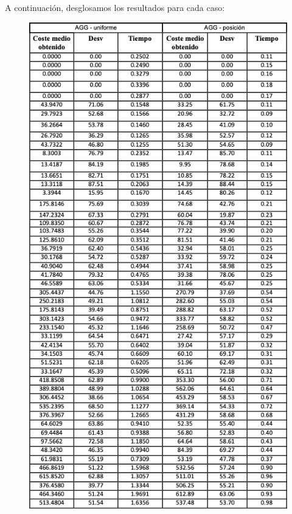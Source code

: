 A continuación, desglosamos los resultados para cada caso:
\begin{figure}[H] %
    \centering
        \includegraphics[scale=0.7]{img/agg.png}
\end{figure}
